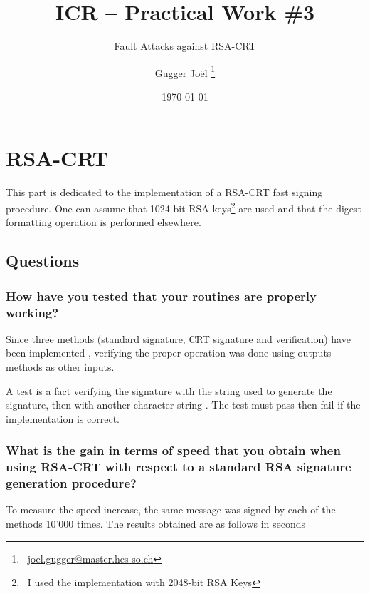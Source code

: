 \documentclass[a4paper]{report}
\title{ICR -- Practical Work \#3}
\subtitle{Fault Attacks against RSA-CRT}
\author{Gugger Joël \thanks{\ \href{mailto:joel.gugger@master.hes-so.ch}{joel.gugger@master.hes-so.ch}}}
\date{\today}
\begin{document}
 
\maketitle


\tableofcontents

 
\chapter{RSA-CRT}
This part is dedicated to the implementation of a RSA-CRT fast signing procedure. One can assume that 1024-bit RSA keys\footnote{\ I used the implementation with 2048-bit RSA Keys} are used and that the digest formatting operation is performed elsewhere.

\section{Questions}
\subsection{How have you tested that your routines are properly working?}
Since three methods (standard signature, CRT signature and verification) have been implemented , verifying the proper operation was done using outputs methods as other inputs.

A test is a fact verifying the signature with the string used to generate the signature, then with another character string . The test must pass then fail if the implementation is correct.

\subsection{What is the gain in terms of speed that you obtain when using RSA-CRT with respect to a standard RSA signature generation procedure?}
To measure the speed increase, the same message was signed by each of the methods 10'000 times. The results obtained are as follows in seconds
\end{document}
